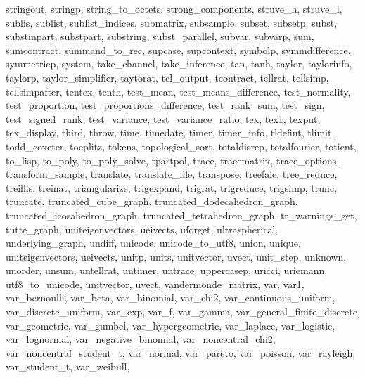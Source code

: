 {{    stringout,
    stringp,
    string_to_octets,
    strong_components,
    struve_h,
    struve_l,
    sublis,
    sublist,
    sublist_indices,
    submatrix,
    subsample,
    subset,
    subsetp,
    subst,
    substinpart,
    substpart,
    substring,
    subst_parallel,
    subvar,
    subvarp,
    sum,
    sumcontract,
    summand_to_rec,
    supcase,
    supcontext,
    symbolp,
    symmdifference,
    symmetricp,
    system,
    take_channel,
    take_inference,
    tan,
    tanh,
    taylor,
    taylorinfo,
    taylorp,
    taylor_simplifier,
    taytorat,
    tcl_output,
    tcontract,
    tellrat,
    tellsimp,
    tellsimpafter,
    tentex,
    tenth,
    test_mean,
    test_means_difference,
    test_normality,
    test_proportion,
    test_proportions_difference,
    test_rank_sum,
    test_sign,
    test_signed_rank,
    test_variance,
    test_variance_ratio,
    tex,
    tex1,
    texput,
    tex_display,
    third,
    throw,
    time,
    timedate,
    timer,
    timer_info,
    tldefint,
    tlimit,
    todd_coxeter,
    toeplitz,
    tokens,
    topological_sort,
    totaldisrep,
    totalfourier,
    totient,
    to_lisp,
    to_poly,
    to_poly_solve,
    tpartpol,
    trace,
    tracematrix,
    trace_options,
    transform_sample,
    translate,
    translate_file,
    transpose,
    treefale,
    tree_reduce,
    treillis,
    treinat,
    triangularize,
    trigexpand,
    trigrat,
    trigreduce,
    trigsimp,
    trunc,
    truncate,
    truncated_cube_graph,
    truncated_dodecahedron_graph,
    truncated_icosahedron_graph,
    truncated_tetrahedron_graph,
    tr_warnings_get,
    tutte_graph,
    uniteigenvectors,
    ueivects,
    uforget,
    ultraspherical,
    underlying_graph,
    undiff,
    unicode,
    unicode_to_utf8,
    union,
    unique,
    uniteigenvectors,
    ueivects,
    unitp,
    units,
    unitvector,
    uvect,
    unit_step,
    unknown,
    unorder,
    unsum,
    untellrat,
    untimer,
    untrace,
    uppercasep,
    uricci,
    uriemann,
    utf8_to_unicode,
    unitvector,
    uvect,
    vandermonde_matrix,
    var,
    var1,
    var_bernoulli,
    var_beta,
    var_binomial,
    var_chi2,
    var_continuous_uniform,
    var_discrete_uniform,
    var_exp,
    var_f,
    var_gamma,
    var_general_finite_discrete,
    var_geometric,
    var_gumbel,
    var_hypergeometric,
    var_laplace,
    var_logistic,
    var_lognormal,
    var_negative_binomial,
    var_noncentral_chi2,
    var_noncentral_student_t,
    var_normal,
    var_pareto,
    var_poisson,
    var_rayleigh,
    var_student_t,
    var_weibull,
}}
